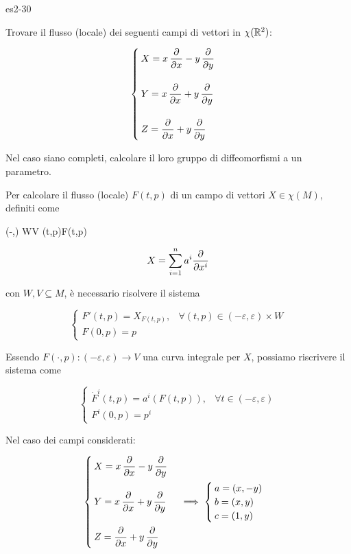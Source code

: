 {es2-30}
{
Trovare il flusso (locale) dei seguenti campi di vettori in $ \chi(\mathbb{R}^{2}) $:

\begin{equation}
	\begin{cases}
		X = x \, \dpdv{x} - y \, \dpdv{y} \\ \\
		Y = x \, \dpdv{x} + y \, \dpdv{y} \\ \\
		Z = \dpdv{x} + y \, \dpdv{y}
	\end{cases}
\end{equation}

Nel caso siano completi, calcolare il loro gruppo di diffeomorfismi a un parametro.
}
{
Per calcolare il flusso (locale) $ F(t,p) $ di un campo di vettori $ X \in \chi(M) $, definiti come

	{(-\varepsilon,\varepsilon) \times W}{V}
	{(t,p)}{F(t,p)}

\begin{equation}
	X = \sum_{i=1}^{n} a^{i} \pdv{x^{i}}
\end{equation}

con $ W,V \subseteq M $, è necessario risolvere il sistema

\begin{equation}
	\begin{cases}
		F'(t,p) = X_{F(t,p)}, & \forall (t,p) \in (-\varepsilon,\varepsilon) \times W \\
		F(0,p) = p
	\end{cases}
\end{equation}

Essendo $ F(\cdot,p) : (-\varepsilon,\varepsilon) \to V $ una curva integrale per $ X $, possiamo riscrivere il sistema come

\begin{equation}
	\begin{cases}
		\dot{F}^{i}(t,p) = a^{i}(F(t,p)), & \forall t \in (-\varepsilon,\varepsilon) \\
		F^{i}(0,p) = p^{i}
	\end{cases}
\end{equation}

Nel caso dei campi considerati:

\begin{equation}
	\begin{cases}
		X = x \, \dpdv{x} - y \, \dpdv{y} \\ \\
		Y = x \, \dpdv{x} + y \, \dpdv{y} \\ \\
		Z = \dpdv{x} + y \, \dpdv{y}
	\end{cases} %
	\implies %
	\begin{cases}
		a = (x,-y) \\
		b = (x,y) \\
		c = (1,y)
	\end{cases}
\end{equation}

}
